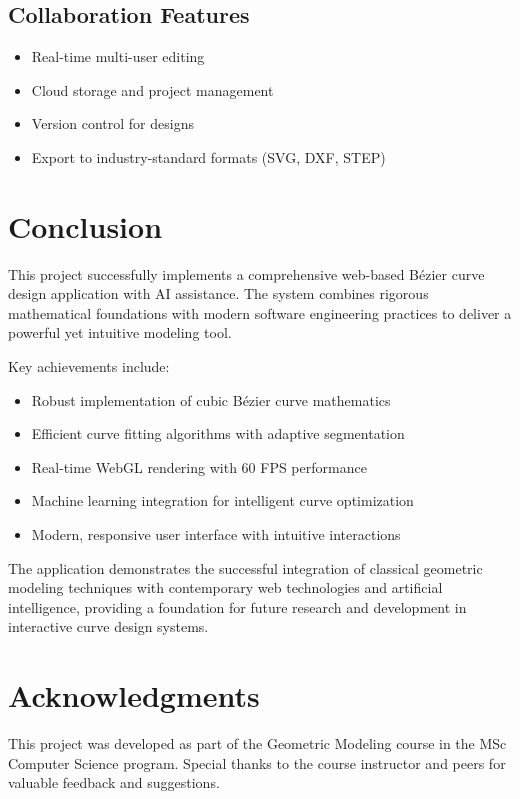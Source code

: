 \documentclass[12pt,a4paper]{article}
\begin{document}
\subsection{Collaboration Features}
\begin{itemize}
    \item Real-time multi-user editing
    \item Cloud storage and project management
    \item Version control for designs
    \item Export to industry-standard formats (SVG, DXF, STEP)
\end{itemize}

\section{Conclusion}

This project successfully implements a comprehensive web-based Bézier curve design application with AI assistance. The system combines rigorous mathematical foundations with modern software engineering practices to deliver a powerful yet intuitive modeling tool.

Key achievements include:
\begin{itemize}
    \item Robust implementation of cubic Bézier curve mathematics
    \item Efficient curve fitting algorithms with adaptive segmentation
    \item Real-time WebGL rendering with 60 FPS performance
    \item Machine learning integration for intelligent curve optimization
    \item Modern, responsive user interface with intuitive interactions
\end{itemize}

The application demonstrates the successful integration of classical geometric modeling techniques with contemporary web technologies and artificial intelligence, providing a foundation for future research and development in interactive curve design systems.

\section*{Acknowledgments}
This project was developed as part of the Geometric Modeling course in the MSc Computer Science program. Special thanks to the course instructor and peers for valuable feedback and suggestions.
\end{document}
